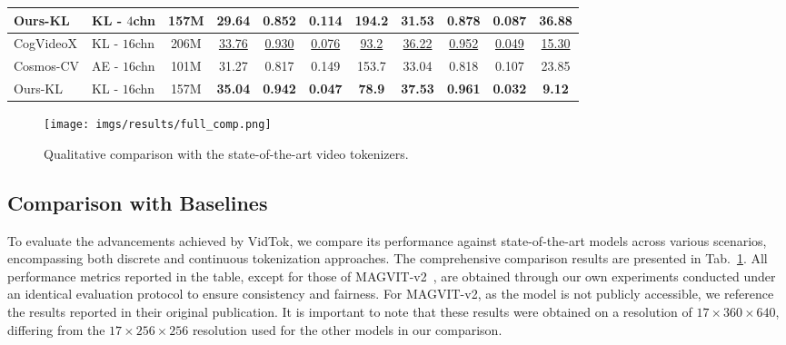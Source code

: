 \documentclass{article} %
\begin{document}
\begin{table}[t]
\begin{center}
\begin{tabular}{l|l|c|cccc|cccc}
    Ours-KL  & KL - $4$chn & 157M  & \textbf{29.64} & \textbf{0.852}& \textbf{0.114}& \textbf{194.2} & \textbf{31.53} & \textbf{0.878} & \textbf{0.087} & \textbf{36.88} \\
    \midrule
    CogVideoX & KL - $16$chn & 206M  & \underline{33.76} & \underline{0.930} & \underline{0.076} & \underline{93.2} & \underline{36.22}& \underline{0.952}& \underline{0.049}& \underline{15.30}\\
    Cosmos-CV & AE - $16$chn & 101M  & 31.27 & 0.817 & 0.149 & 153.7& 33.04 &0.818& 0.107& 23.85\\
    Ours-KL & KL - $16$chn & 157M & \textbf{35.04} & \textbf{0.942}& \textbf{0.047}& \textbf{78.9}& \textbf{37.53} & \textbf{0.961} & \textbf{0.032} & \textbf{9.12} \\
    \bottomrule[1.5pt]
    \end{tabular}
    \label{tab:general_comp}
\end{center}
\end{table}

\begin{figure}[!h]
  \centering
  \texttt{[image: imgs/results/full\_comp.png]}
  \vspace{-3mm}
  \caption{Qualitative comparison with the state-of-the-art video tokenizers.}
  \label{fig:full_comp}
\end{figure}


\subsection{Comparison with Baselines}
\label{sec:comparison_with_baselines}

To evaluate the advancements achieved by VidTok, we compare its performance against state-of-the-art models across various scenarios, encompassing both discrete and continuous tokenization approaches. The comprehensive comparison results are presented in Tab.~\ref{tab:general_comp}. All performance metrics reported in the table, except for those of MAGVIT-v2~\citep{yu2024language}, are obtained through our own experiments conducted under an identical evaluation protocol to ensure consistency and fairness. For MAGVIT-v2, as the model is not publicly accessible, we reference the results reported in their original publication. It is important to note that these results were obtained on a resolution of $17 \times 360 \times 640$, differing from the $17 \times 256 \times 256$ resolution used for the other models in our comparison.
\end{document}
